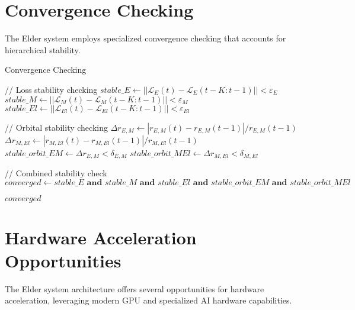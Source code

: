 \section{Convergence Checking}

The Elder system employs specialized convergence checking that accounts for hierarchical stability.

\begin{algorithm}
\caption{Convergence Checking}
\begin{algorithmic}[1]
    \State // Loss stability checking
    \State $stable\_E \gets ||\mathcal{L}_E(t) - \mathcal{L}_E(t-K:t-1)|| < \varepsilon_E$
    \State $stable\_M \gets ||\mathcal{L}_M(t) - \mathcal{L}_M(t-K:t-1)|| < \varepsilon_M$
    \State $stable\_El \gets ||\mathcal{L}_{El}(t) - \mathcal{L}_{El}(t-K:t-1)|| < \varepsilon_{El}$
    
    \State // Orbital stability checking
    \State $\Delta r_{E,M} \gets |r_{E,M}(t) - r_{E,M}(t-1)|/r_{E,M}(t-1)$
    \State $\Delta r_{M,El} \gets |r_{M,El}(t) - r_{M,El}(t-1)|/r_{M,El}(t-1)$
    \State $stable\_orbit\_EM \gets \Delta r_{E,M} < \delta_{E,M}$
    \State $stable\_orbit\_MEl \gets \Delta r_{M,El} < \delta_{M,El}$
    
    \State // Combined stability check
    \State $converged \gets stable\_E \textbf{ and } stable\_M \textbf{ and } stable\_El \textbf{ and } stable\_orbit\_EM \textbf{ and } stable\_orbit\_MEl$
    
    \State \Return $converged$
\EndFunction
\end{algorithmic}
\end{algorithm}

\section{Hardware Acceleration Opportunities}

The Elder system architecture offers several opportunities for hardware acceleration, leveraging modern GPU and specialized AI hardware capabilities.

